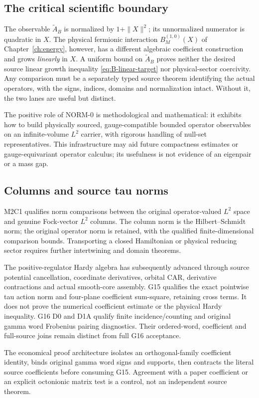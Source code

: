\subsection{The critical scientific boundary}
The observable $\widetilde A_B$ is normalized by $1+\|X\|^2$;
its unnormalized numerator is quadratic in $X$. The physical
fermionic interaction $B_M^{(1,0)}(X)$ of
Chapter~\ref{ch:energy}, however, has a different algebraic
coefficient construction and grows \emph{linearly} in $X$. A uniform
bound on $\widetilde A_B$ proves neither the desired source linear
growth inequality \eqref{eq:B-linear-target} nor physical-sector
coercivity. Any comparison must be a separately typed source theorem
identifying the actual operators, with the signs, indices, domains and
normalization intact. Without it, the two lanes are useful but distinct.

The positive role of NORM-0 is methodological and mathematical: it
exhibits how to build physically sourced, gauge-compatible bounded
operator observables on an infinite-volume $L^2$ carrier, with rigorous
handling of null-set representatives. This infrastructure may aid
future compactness estimates or gauge-equivariant operator calculus;
its usefulness is not evidence of an eigenpair or a mass gap.

\subsection{Columns and source tau norms}
\label{sec:ed08-tau}
M2C1 qualifies norm comparisons between the original operator-valued
$L^2$ space and genuine Fock-vector $L^2$ columns. The column norm
is the Hilbert--Schmidt norm; the original operator norm is retained,
with the qualified finite-dimensional comparison bounds. Transporting
a closed Hamiltonian or physical reducing sector requires further
intertwining and domain theorems.

The positive-regulator Hardy algebra has subsequently advanced
through source potential cancellation, coordinate derivatives,
orbital CAR, derivative contractions and actual smooth-core assembly.
G15 qualifies the exact pointwise tau action norm and four-plane
coefficient sum-square, retaining cross terms. It does not prove the
numerical coefficient estimate or the physical Hardy inequality.
G16 D0 and D1A qualify finite incidence/counting and original gamma
word Frobenius pairing diagnostics. Their ordered-word, coefficient
and full-source joins remain distinct from full G16 acceptance.

The economical proof architecture isolates an orthogonal-family
coefficient identity, binds original gamma word signs and supports,
then contracts the literal source coefficients before consuming G15.
Agreement with a paper coefficient or an explicit octonionic matrix
test is a control, not an independent source theorem.
